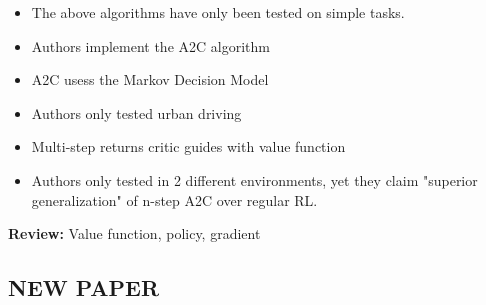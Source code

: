 \documentclass{article}
\begin{document}
\begin{itemize}
	\item The above algorithms have only been tested on simple tasks.
	
	\item Authors implement the A2C algorithm
	
	\item A2C usess the Markov Decision Model
	
	\item Authors only tested urban driving
	
	\item Multi-step returns critic guides with value function
	
	\item Authors only tested in 2 different environments, yet they claim "superior generalization" of n-step A2C over regular RL.
	
	
	
\end{itemize}

\textbf{Review:} Value function, policy, gradient

\subsection*{NEW PAPER} 
\end{document}
